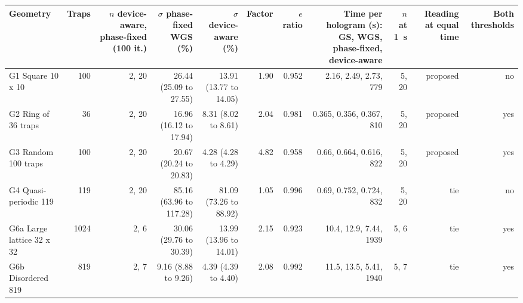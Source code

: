 \begin{tabular}{@{}l r r r r r r r r r r@{}}
\toprule
Geometry & Traps & $n$ device-aware, phase-fixed (100 it.) & $\sigma$ phase-fixed WGS (\%) & $\sigma$ device-aware (\%) & Factor & $e$ ratio & Time per hologram (s): GS, WGS, phase-fixed, device-aware & $n$ at 1~s & Reading at equal time & Both thresholds \\
\midrule
G1 Square 10 x 10 & 100 & 2, 20 & 26.44 (25.09 to 27.55) & 13.91 (13.77 to 14.05) & 1.90 & 0.952 & 2.16, 2.49, 2.73, 779 & 5, 20 & proposed & no \\
G2 Ring of 36 traps & 36 & 2, 20 & 16.96 (16.12 to 17.94) & 8.31 (8.02 to 8.61) & 2.04 & 0.981 & 0.365, 0.356, 0.367, 810 & 5, 20 & proposed & yes \\
G3 Random 100 traps & 100 & 2, 20 & 20.67 (20.24 to 20.83) & 4.28 (4.28 to 4.29) & 4.82 & 0.958 & 0.66, 0.664, 0.616, 822 & 5, 20 & proposed & yes \\
G4 Quasi-periodic 119 & 119 & 2, 20 & 85.16 (63.96 to 117.28) & 81.09 (73.26 to 88.92) & 1.05 & 0.996 & 0.69, 0.752, 0.724, 832 & 5, 20 & tie & no \\
G6a Large lattice 32 x 32 & 1024 & 2, 6 & 30.06 (29.76 to 30.39) & 13.99 (13.96 to 14.01) & 2.15 & 0.923 & 10.4, 12.9, 7.44, 1939 & 5, 6 & tie & yes \\
G6b Disordered 819 & 819 & 2, 7 & 9.16 (8.88 to 9.26) & 4.39 (4.39 to 4.40) & 2.08 & 0.992 & 11.5, 13.5, 5.41, 1940 & 5, 7 & tie & yes \\
\bottomrule
\end{tabular}
